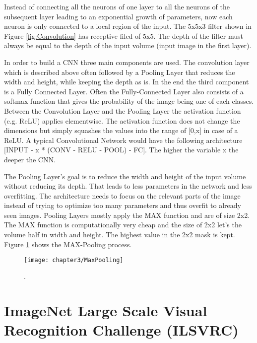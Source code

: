 Instead of connecting all the neurons of one layer to all the neurons of the subsequent layer leading to an exponential growth of parameters, now each neuron is only connected to a local region of the input. The 5x5x3 filter shown in Figure \ref{fig:Convolution} has receptive filed of 5x5. The depth of the filter must always be equal to the depth of the input volume (input image in the first layer).

In order to build a CNN three main components are used. The convolution layer which is described above often followed by a Pooling Layer that reduces the width and height, while keeping the depth as is. In the end the third component is a Fully Connected Layer. Often the Fully-Connected Layer also consists of a softmax function that gives the probability of the image being one of each classes. Between the Convolution Layer and the Pooling Layer the activation function (e.g. ReLU) applies elementwise. The activation function does not change the dimensions but simply squashes the values into the range of [0,x] in case of a ReLU. A typical Convolutional Network would have the following architecture [INPUT - x * (CONV - RELU - POOL) - FC]. The higher the variable x the deeper the CNN.

The Pooling Layer's goal is to reduce the width and height of the input volume without reducing its depth. That leads to less parameters in the network and less overfitting. The architecture needs to focus on the relevant parts of the image instead of trying to optimize too many parameters and thus overfit to already seen images. Pooling Layers mostly apply the MAX function and are of size 2x2. The MAX function is computationally very cheap and the size of 2x2 let's the volume half in width and height. The highest value in the 2x2 mask is kept. Figure \ref{fig:MaxPooling} shows the MAX-Pooling process.

\begin{figure}[H]
  \centering
  \caption{. \cite{cs231convnetworks}}
  \texttt{[image: chapter3/MaxPooling]}
  \label{fig:MaxPooling}
\end{figure}


\section{ImageNet Large Scale Visual Recognition Challenge (ILSVRC)}

